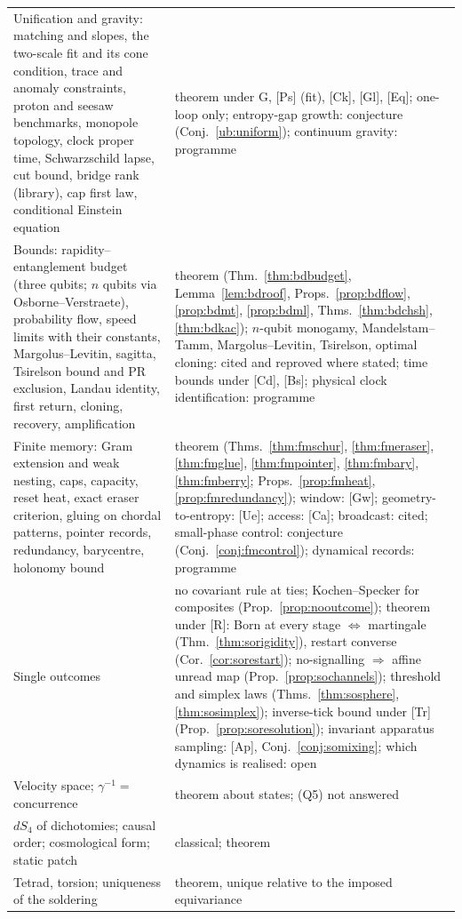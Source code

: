 \documentclass[aps,pra,onecolumn,superscriptaddress,nofootinbib,10pt]{revtex4-2}
\theoremstyle{definition}
\theoremstyle{remark}
\begin{document}
\begin{table}[h]
\begin{tabular}{@{}p{}p{}@{}}
Unification and gravity: matching and slopes, the two-scale fit and its cone condition, trace and anomaly constraints, proton and seesaw benchmarks, monopole topology, clock proper time, Schwarzschild lapse, cut bound, bridge rank (library), cap first law, conditional Einstein equation & theorem under G, [Ps] (fit), [Ck], [Gl], [Eq]; one-loop only; entropy-gap growth: conjecture (Conj.~\ref{ub:uniform}); continuum gravity: programme\\
Bounds: rapidity--entanglement budget (three qubits; $n$ qubits via Osborne--Verstraete), probability flow, speed limits with their constants, Margolus--Levitin, sagitta, Tsirelson bound and PR exclusion, Landau identity, first return, cloning, recovery, amplification & theorem (Thm.~\ref{thm:bdbudget}, Lemma~\ref{lem:bdroof}, Props.~\ref{prop:bdflow}, \ref{prop:bdmt}, \ref{prop:bdml}, Thms.~\ref{thm:bdchsh}, \ref{thm:bdkac}); $n$-qubit monogamy, Mandelstam--Tamm, Margolus--Levitin, Tsirelson, optimal cloning: cited and reproved where stated; time bounds under [Cd], [Bs]; physical clock identification: programme\\
Finite memory: Gram extension and weak nesting, caps, capacity, reset heat, exact eraser criterion, gluing on chordal patterns, pointer records, redundancy, barycentre, holonomy bound & theorem (Thms.~\ref{thm:fmschur}, \ref{thm:fmeraser}, \ref{thm:fmglue}, \ref{thm:fmpointer}, \ref{thm:fmbary}, \ref{thm:fmberry}; Props.~\ref{prop:fmheat}, \ref{prop:fmredundancy}); window: [Gw]; geometry-to-entropy: [Ue]; access: [Ca]; broadcast: cited; small-phase control: conjecture (Conj.~\ref{conj:fmcontrol}); dynamical records: programme\\
Single outcomes & no covariant rule at ties; Kochen--Specker for composites (Prop.~\ref{prop:nooutcome}); theorem under [R]: Born at every stage $\Leftrightarrow$ martingale (Thm.~\ref{thm:sorigidity}), restart converse (Cor.~\ref{cor:sorestart}); no-signalling $\Rightarrow$ affine unread map (Prop.~\ref{prop:sochannels}); threshold and simplex laws (Thms.~\ref{thm:sosphere}, \ref{thm:sosimplex}); inverse-tick bound under [Tr] (Prop.~\ref{prop:soresolution}); invariant apparatus sampling: [Ap], Conj.~\ref{conj:somixing}; which dynamics is realised: open\\
Velocity space; $\gamma^{-1}=$ concurrence & theorem about states; (Q5) not answered\\
$dS_4$ of dichotomies; causal order; cosmological form; static patch & classical; theorem\\
Tetrad, torsion; uniqueness of the soldering & theorem, unique relative to the imposed equivariance\\

\end{tabular}
\end{table}
\end{document}
